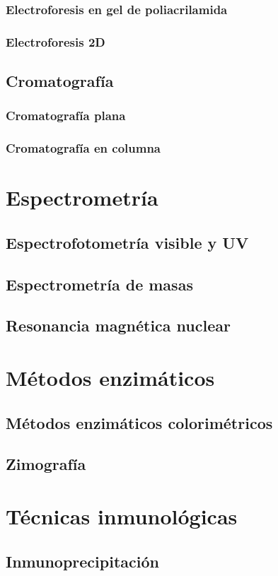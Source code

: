 \documentclass[10pt,a4paper,onecolumn,openany]{book}
\begin{document}
\subsection{Electroforesis en gel de poliacrilamida}
\subsection{Electroforesis 2D}
\section{Cromatografía}
\subsection{Cromatografía plana}
\subsection{Cromatografía en columna}
\chapter{Espectrometría}
\section{Espectrofotometría visible y UV}
\section{Espectrometría de masas}
\section{Resonancia magnética nuclear}
\chapter{Métodos enzimáticos}
\section{Métodos enzimáticos colorimétricos}
\section{Zimografía}
\chapter{Técnicas inmunológicas}
\section{Inmunoprecipitación}
\end{document}
